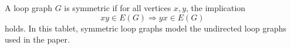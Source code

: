 \begin{definition}
A loop graph \(G\) is symmetric if for all vertices \(x,y\), the implication
\[
  xy \in E(G) \Longrightarrow yx \in E(G)
\]
holds. In this tablet, symmetric loop graphs model the undirected loop graphs used in the paper.
\end{definition}
